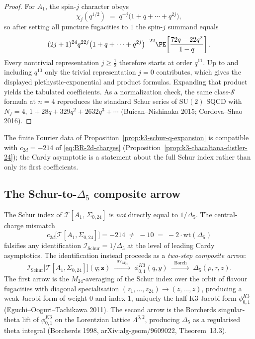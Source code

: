 \begin{proof}
For $A_1$, the spin-$j$ character obeys
\[
 \chi_j(q^{1/2})
 \;=\;
 q^{-j}\bigl(1+q+\cdots+q^{2j}\bigr),
\]
so after setting all puncture fugacities to $1$ the spin-$j$ summand equals
\[
 (2j+1)^{24} q^{22j}\bigl(1+q+\cdots+q^{2j}\bigr)^{-22}
 \PE\!\left[\frac{72q-22q^2}{1-q}\right].
\]
Every nontrivial representation $j\geq \tfrac{1}{2}$ therefore starts at
order $q^{11}$. Up to and including $q^{10}$ only the trivial representation
$j=0$ contributes, which gives the displayed plethystic-exponential and
product formulas. Expanding that product yields the tabulated coefficients.
As a normalization check, the same class-$\mathcal{S}$ formula at $n=4$
reproduces the standard Schur series of $\mathrm{SU}(2)$ SQCD with
$N_f=4$,
$1+28q+329q^2+2632q^3+\cdots$
(Buican--Nishinaka 2015; Cordova--Shao 2016).
\end{proof}

The finite Fourier data of Proposition~\ref{prop:k3-schur-q-expansion}
is compatible with $c_{2d} = -214$ of \eqref{eq:BR-2d-charges}
(Proposition~\ref{prop:k3-chacaltana-distler-24}); the Cardy asymptotic is a
statement about the full Schur index rather than only its first coefficients.

\subsection{The Schur-to-\texorpdfstring{$\Delta_5$}{Delta-5} composite arrow}
\label{subsec:schur-to-delta5-composite}

\begin{theorem}
\label{thm:schur-to-delta5-composite}
The Schur index of $\mathcal{T}[A_1,\,\Sigma_{0,24}]$ is \emph{not} directly
equal to $1/\Delta_5$. The central-charge mismatch
\[
 c_{2d}\bigl[\mathcal{T}[A_1,\Sigma_{0,24}]\bigr] = -214
 \;\neq\;
 -10 \;=\; -2\cdot \mathrm{wt}(\Delta_5)
\]
falsifies any identification $\mathcal{I}_{\mathrm{Schur}} = 1/\Delta_5$ at
the level of leading Cardy asymptotics. The identification instead proceeds
as a \emph{two-step composite arrow}:
\[
 \mathcal{I}_{\mathrm{Schur}}\bigl[\mathcal{T}[A_1,\Sigma_{0,24}]\bigr](q;\mathbf{z})
 \;\xrightarrow{\;\ \mathrm{av}_{M_{24}}\ \;}\;
 \phi_{0,1}^{K3}(q,y)
 \;\xrightarrow{\;\ \mathrm{Borch}\ \;}\;
 \Delta_5(\rho,\tau,z).
\]
The first arrow is the $M_{24}$-averaging of the Schur index over the orbit
of flavour fugacities with diagonal specialisation
$(z_1,\ldots,z_{24}) \to (z,\ldots,z)$, producing a weak Jacobi form of
weight $0$ and index $1$, uniquely the half K3 Jacobi form $\phi_{0,1}^{K3}$
(Eguchi--Ooguri--Tachikawa 2011). The second arrow is the Borcherds
singular-theta lift of $\phi_{0,1}^{K3}$ on the Lorentzian lattice
$\Lambda^{3,2}$, producing $\Delta_5$ as a regularised theta integral
(Borcherds 1998, arXiv:alg-geom/9609022, Theorem~13.3).
\end{theorem}

